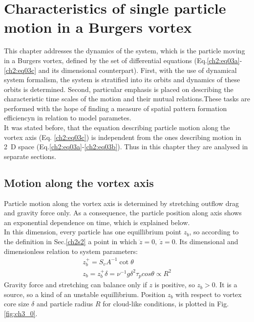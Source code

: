 \documentclass[../main.tex]{subfiles}
\begin{document}
\chapter{Characteristics of single particle motion in a Burgers vortex} %

\label{ch:single} %

This chapter addresses the dynamics of the system, which is the particle moving in a Burgers vortex, defined by the set of differential equations (Eq.\ref{ch2:eq03a}-\ref{ch2:eq03c} and its dimensional counterpart). First, with the use of dynamical system formalism, the system is stratified into its orbits and dynamics of these orbits is determined. Second, particular emphasis is placed on describing the characteristic time scales of the motion and their mutual relations.These tasks are performed with the hope of finding a measure of spatial pattern formation efficiencyn in relation to model parametes.\\
It was stated before, that the equation describing particle motion along the vortex axis (Eq. \ref{ch2:eq03c}) is independent from the ones describing motion in 2~D space (Eq.\ref{ch2:eq03a}-\ref{ch2:eq03b}). Thus in this chapter they are analysed in separate sections.
 
\section{Motion along the vortex axis}
Particle motion along the vortex axis is determined by stretching outflow drag and gravity force only. As a consequence, the particle position along axis shows an exponential dependence on time, which is explained below.\\
In this dimension, every particle has one equillibrium point $z_b$, so according to the definition in Sec.\ref{ch2s2} a point in which $\ddot{z}=0,\ \dot{z}=0$. Its dimensional and dimensionless relation to system parameters:
\begin{align}
z^+_b=S_v A^{-1} \cot\theta\\
z_b=z^+_b \delta=\nu^{-1}g \delta^2 \tau_p cos\theta \propto R^2
\label{def:z_b}
\end{align}
Gravity force and stretching can balance only if $z$ is positive, so $z_b>0$. It is a source, so a kind of an unstable equillibrium. Position $z_b$ with respect to vortex core size $\delta$ and particle radius $R$ for cloud-like conditions, is plotted in Fig.\ref{fig:ch3_0}.
\end{document}

